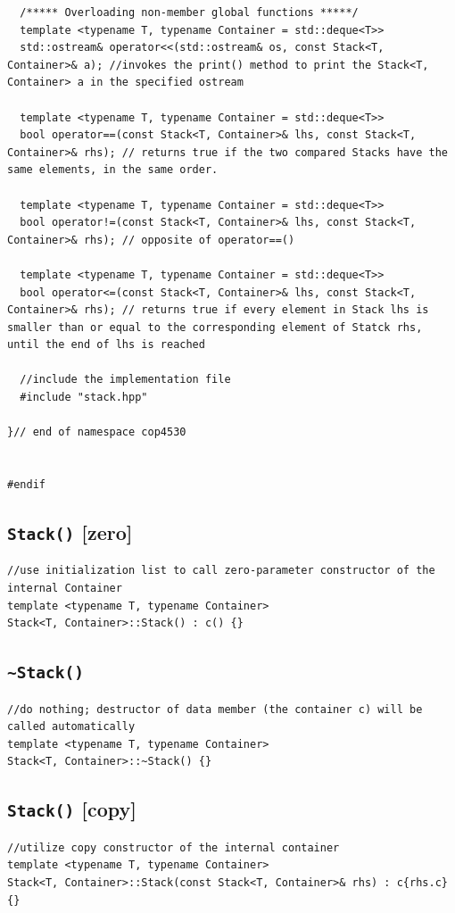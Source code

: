 \documentclass[11pt]{book}
\begin{document}
\begin{verbatim}
  /***** Overloading non-member global functions *****/
  template <typename T, typename Container = std::deque<T>>
  std::ostream& operator<<(std::ostream& os, const Stack<T, Container>& a); //invokes the print() method to print the Stack<T, Container> a in the specified ostream    

  template <typename T, typename Container = std::deque<T>>
  bool operator==(const Stack<T, Container>& lhs, const Stack<T, Container>& rhs); // returns true if the two compared Stacks have the same elements, in the same order. 

  template <typename T, typename Container = std::deque<T>>
  bool operator!=(const Stack<T, Container>& lhs, const Stack<T, Container>& rhs); // opposite of operator==()

  template <typename T, typename Container = std::deque<T>>
  bool operator<=(const Stack<T, Container>& lhs, const Stack<T, Container>& rhs); // returns true if every element in Stack lhs is smaller than or equal to the corresponding element of Statck rhs, until the end of lhs is reached

  //include the implementation file 
  #include "stack.hpp"

}// end of namespace cop4530


#endif
\end{verbatim}
\subsection{\texttt{Stack()} [zero]}
\label{sec:org6e2dcc0}
\begin{verbatim}
//use initialization list to call zero-parameter constructor of the internal Container 
template <typename T, typename Container>
Stack<T, Container>::Stack() : c() {}
\end{verbatim}
\subsection{\texttt{\textasciitilde{}Stack()}}
\label{sec:orga69d901}
\begin{verbatim}
//do nothing; destructor of data member (the container c) will be called automatically
template <typename T, typename Container>
Stack<T, Container>::~Stack() {}
\end{verbatim}
\subsection{\texttt{Stack()} [copy]}
\label{sec:orgf5b10de}
\begin{verbatim}
//utilize copy constructor of the internal container
template <typename T, typename Container>
Stack<T, Container>::Stack(const Stack<T, Container>& rhs) : c{rhs.c} {}
\end{verbatim}
\end{document}
